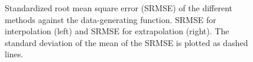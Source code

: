 \documentclass[onecolumn,a4paper,11pt]{article}
\begin{document}
\begin{figure}
\caption{Standardized root mean square error (SRMSE) of the different methods against the data-generating function. SRMSE for interpolation (left) and SRMSE for extrapolation (right). The standard deviation of the mean of the SRMSE is plotted as dashed lines.}
  \label{ch5_fig11_MSE_exI_inter}
\end{figure}
\end{document}
